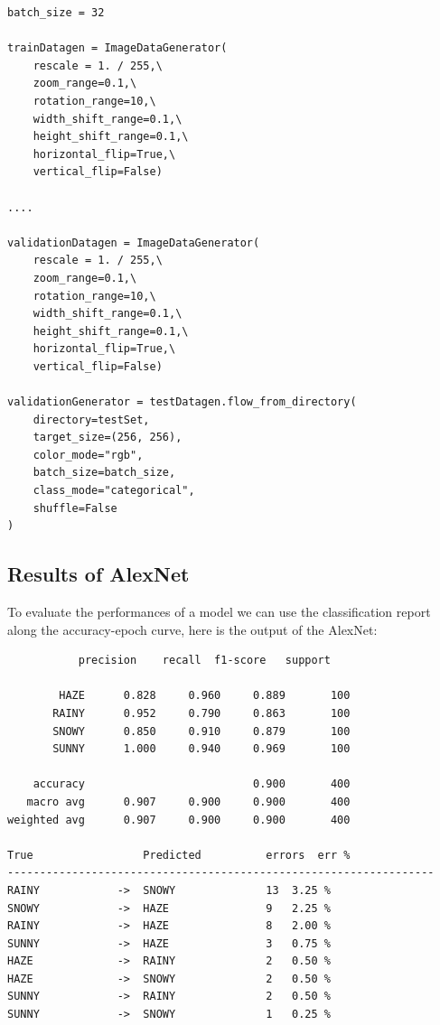 \documentclass{article}
\begin{document}
 \begin{verbatim}
batch_size = 32

trainDatagen = ImageDataGenerator(
    rescale = 1. / 255,\
    zoom_range=0.1,\
    rotation_range=10,\
    width_shift_range=0.1,\
    height_shift_range=0.1,\
    horizontal_flip=True,\
    vertical_flip=False)

....

validationDatagen = ImageDataGenerator(
    rescale = 1. / 255,\
    zoom_range=0.1,\
    rotation_range=10,\
    width_shift_range=0.1,\
    height_shift_range=0.1,\
    horizontal_flip=True,\
    vertical_flip=False)

validationGenerator = testDatagen.flow_from_directory(
    directory=testSet,
    target_size=(256, 256),
    color_mode="rgb",
    batch_size=batch_size,
    class_mode="categorical",
    shuffle=False
)

 \end{verbatim}

\subsection{Results of AlexNet}

To evaluate the performances of a model we can use the classification report along the accuracy-epoch curve, here is the output of the AlexNet:

\begin{verbatim}
           precision    recall  f1-score   support

        HAZE      0.828     0.960     0.889       100
       RAINY      0.952     0.790     0.863       100
       SNOWY      0.850     0.910     0.879       100
       SUNNY      1.000     0.940     0.969       100

    accuracy                          0.900       400
   macro avg      0.907     0.900     0.900       400
weighted avg      0.907     0.900     0.900       400

True                 Predicted         	errors 	err % 
------------------------------------------------------------------
RAINY            ->  SNOWY             	13 	3.25 % 
SNOWY            ->  HAZE              	9 	2.25 % 
RAINY            ->  HAZE              	8 	2.00 % 
SUNNY            ->  HAZE              	3 	0.75 % 
HAZE             ->  RAINY             	2 	0.50 % 
HAZE             ->  SNOWY             	2 	0.50 % 
SUNNY            ->  RAINY             	2 	0.50 % 
SUNNY            ->  SNOWY             	1 	0.25 % 

\end{verbatim}
\end{document}
